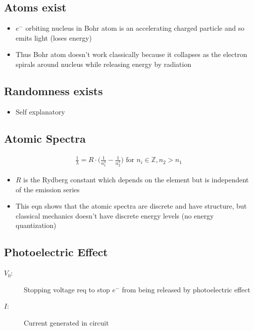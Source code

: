 \documentclass[a4paper,12pt]{article}
\begin{document}
\subsection{Atoms exist}
\begin{itemize}
  \item $e^{-}$ orbiting nucleus in Bohr atom is an accelerating charged particle and so emits light (loses energy)
  \item Thus Bohr atom doesn't work classically because it collapses as the electron spirals around nucleus while releasing energy by radiation
\end{itemize}

\subsection{Randomness exists}
\begin{itemize}
  \item Self explanatory
\end{itemize}


\subsection{Atomic Spectra}
\begin{align}
  \frac{1}{\lambda} = R \cdot \Big(\frac{1}{n_1^2} -\frac{1}{n_2^2}\Big) \text{ for } n_i \in \mathbb{Z}, n_2 > n_1
\end{align}
\begin{itemize}
  \item $R$ is the Rydberg constant which depends on the element but is independent of the emission series
  \item This eqn shows that the atomic spectra are discrete and have structure, but classical mechanics doesn't have discrete energy levels (no energy quantization)
\end{itemize}

\subsection{Photoelectric Effect}
\begin{description}
  \item[$V_0$: ] Stopping voltage req to stop $e^{-}$ from being released by photoelectric effect
  \item[$I$: ] Current generated in circuit
\end{description}
\end{document}
